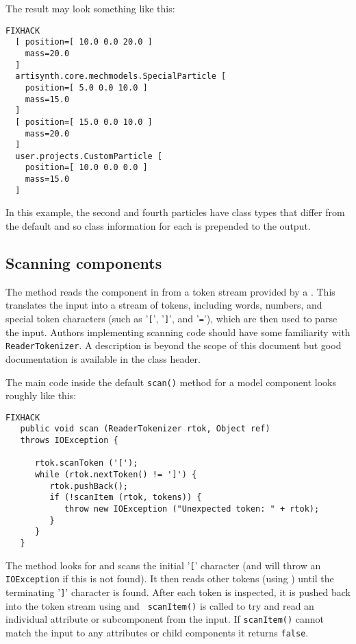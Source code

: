 \documentclass{article}
\begin{document}
The result may look something like this:
\begin{lstlisting}FIXHACK
  [ position=[ 10.0 0.0 20.0 ]
    mass=20.0
  ]
  artisynth.core.mechmodels.SpecialParticle [
    position=[ 5.0 0.0 10.0 ]
    mass=15.0
  ]
  [ position=[ 15.0 0.0 10.0 ]
    mass=20.0
  ]
  user.projects.CustomParticle [ 
    position=[ 10.0 0.0 0.0 ]
    mass=15.0
  ]
\end{lstlisting}
In this example, the second and fourth particles have class types that differ
from the default and so class information for each is prepended
to the output.

\subsection{Scanning components}
\label{scanningComponentsSec}

The  method reads the
component in from a token stream provided by a
. This translates the input
into a stream of tokens, including words, numbers, and special token
characters (such as '{\tt [}', '{\tt ]}', and '{\tt =}'), which are
then used to parse the input. Authors implementing 
scanning code should have some familiarity with {\tt ReaderTokenizer}.
A description is beyond the scope of this document but good
documentation is available in the  
class header.

The main code inside the default {\tt scan()} method for a model
component looks roughly like this:
\begin{lstlisting}FIXHACK
   public void scan (ReaderTokenizer rtok, Object ref) 
   throws IOException {

      rtok.scanToken ('[');
      while (rtok.nextToken() != ']') {
         rtok.pushBack();
         if (!scanItem (rtok, tokens)) {
            throw new IOException ("Unexpected token: " + rtok);
         }
      }
   }
\end{lstlisting}
The method looks for and scans the initial '{\tt [}' character (and
will throw an {\tt IOException} if this is not found). It then reads
other tokens (using
) until the
terminating '{\tt ]}' character is found. After each token is
inspected, it is pushed back into the token stream using
 and {\tt
scanItem()} is called to try and read an individual attribute or
subcomponent from the input. If {\tt scanItem()} cannot match the
input to any attributes or child components it returns {\tt false}.
\end{document}
